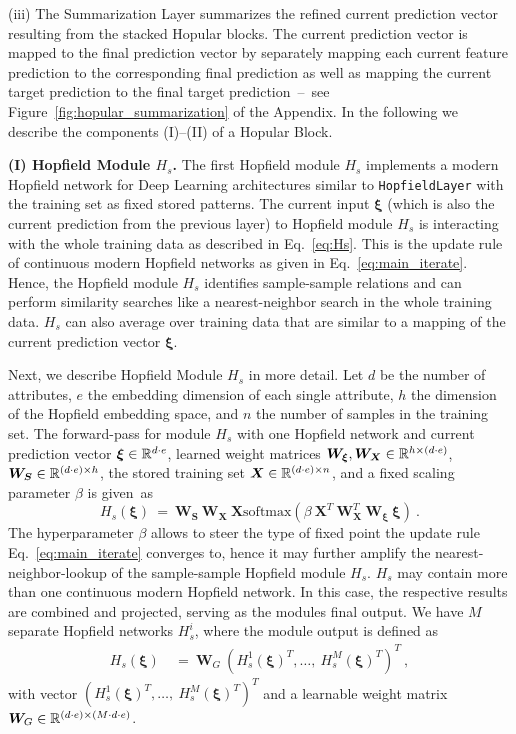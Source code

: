 \documentclass{article}
\theoremstyle{plain}
\theoremstyle{definition}
\theoremstyle{remark}
\newcommand\BS{\bm{S}}
\newcommand\BW{\bm{W}}
\newcommand\BX{\bm{X}}
\newcommand\Bxi{\bm{\xi}}
\newcommand{\soft}{\mathrm{softmax}}
\begin{document}
(iii) The Summarization Layer summarizes the refined current prediction vector resulting from the stacked Hopular blocks.
The current prediction vector is mapped to the final prediction vector by separately mapping each current feature prediction to the corresponding final prediction as well as mapping the current target prediction to the final target prediction~\---{}~see Figure~\ref{fig:hopular_summarization} of the Appendix. In the following we describe the components (I)--(II) of a Hopular Block.

{\bf (I) Hopfield Module $H_{s}$.} 
The first Hopfield module $H_{s}$ implements a modern Hopfield network for Deep Learning architectures
similar to {\tt HopfieldLayer} \citep{Ramsauer:21,Ramsauer:20} 
with the training set as fixed stored patterns.
The current input $\Bxi$ (which is also the current prediction from the previous
layer) to Hopfield module $H_{s}$
is interacting with the whole training data 
as described in Eq.~\eqref{eq:Hs}.
This is the update rule of 
continuous modern Hopfield networks as given in Eq.~\eqref{eq:main_iterate}.
Hence, the Hopfield module $H_{s}$ identifies sample-sample relations
and can perform similarity searches like a nearest-neighbor search 
in the whole training data.
$H_{s}$ can also average over training data that 
are similar to a mapping of the current prediction vector $\Bxi$.

Next, we describe Hopfield Module $H_{s}$ in more detail.
Let $d$ be the number of attributes, 
$e$ the embedding dimension of each single attribute, 
$h$ the dimension of the Hopfield embedding space, and $n$ the number of samples in the training set. 
The forward-pass for module $H_{s}$ with one Hopfield network and
current prediction vector $\Bxi \in \dR^{d \cdot e}$, 
learned weight matrices $\BW_{\Bxi},\BW_{\BX} \in \dR^{h \times (d \cdot e)}$, \ $\BW_{\BS} \in \dR^{(d \cdot e) \times h}$, the stored training set $\BX \in \dR^{(d \cdot e) \times n}$, and a fixed scaling parameter $\beta$
is given~as
\begin{equation}
\label{eq:Hs}
    H_s\left( \Bxi \right) \ = \ \BW_{\BS} \  \BW_{\BX} \ \BX \soft (\beta \ \BX^{T} \ \BW_{\BX}^{T} \ \BW_{\Bxi} \ \Bxi )\ .
\end{equation}
The hyperparameter $\beta$ allows to steer the type of fixed point 
the update rule Eq.~\eqref{eq:main_iterate} converges to, 
hence it may further amplify the nearest-neighbor-lookup of the sample-sample Hopfield module $H_{s}$. $H_{s}$ may contain more than one 
continuous modern Hopfield network.
In this case, the respective results are combined and projected, 
serving as the modules final output. 
We have $M$ separate Hopfield networks $H_{s}^{i}$, where the module output is defined as
\begin{align}\label{eq:Hs_combined}
    H_{s} \left(\Bxi \right) \ &= \ \BW_{G} \ \left( H_{s}^{1} \left( \Bxi \right)^{T}, \ldots,\ H_{s}^{M} \left( \Bxi \right)^{T} \right)^{T}\ ,
\end{align}
with vector $\left( H_{s}^{1} \left( \Bxi \right)^{T}, \ldots,\ H_{s}^{M} \left( \Bxi \right)^{T} \right)^{T}$
and a learnable weight matrix $\BW_{G} \in \dR^{(d\cdot{}e)\times{}(M\cdot{}d\cdot{}e)}$.
\end{document}
